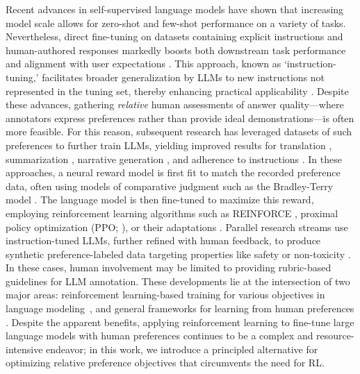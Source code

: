 Recent advances in self-supervised language models have shown that increasing model scale allows for zero-shot \citep{radford2019language} and few-shot performance \citep{gpt3,megatron,chowdhery2022palm} on a variety of tasks. Nevertheless, direct fine-tuning on datasets containing explicit instructions and human-authored responses markedly boosts both downstream task performance and alignment with user expectations \citep{mishra-etal-2022-cross,sanh2022multitask,chung2022scaling,thoppilan2022lamda}. This approach, known as `instruction-tuning,' facilitates broader generalization by LLMs to new instructions not represented in the tuning set, thereby enhancing practical applicability \citep{chung2022scaling}. Despite these advances, gathering \textit{relative} human assessments of answer quality—where annotators express preferences rather than provide ideal demonstrations—is often more feasible. For this reason, subsequent research has leveraged datasets of such preferences to further train LLMs, yielding improved results for translation \citep{kreutzer-etal-2018-reliability}, summarization \citep{stiennon2022learning,ziegler2020finetuning}, narrative generation \citep{ziegler2020finetuning}, and adherence to instructions \citep{ouyang2022training,ramamurthy2023is}. In these approaches, a neural reward model is first fit to match the recorded preference data, often using models of comparative judgment such as the Bradley-Terry model \citep{bradley1952rankanalysis}. The language model is then fine-tuned to maximize this reward, employing reinforcement learning algorithms such as REINFORCE \citep{williams1992reinforce}, proximal policy optimization (PPO; \cite{schulman2017proximal}), or their adaptations \citep{ramamurthy2023is}. Parallel research streams use instruction-tuned LLMs, further refined with human feedback, to produce synthetic preference-labeled data targeting properties like safety or non-toxicity \citep{bai2022constitutional}. In these cases, human involvement may be limited to providing rubric-based guidelines for LLM annotation. These developments lie at the intersection of two major areas: reinforcement learning-based training for various objectives in language modeling~\citep{Ranzato2015SequenceLT,paulus2018a,wu2018learning}, and general frameworks for learning from human preferences \citep{christiano2017deep,kupcsik2018learning}. Despite the apparent benefits, applying reinforcement learning to fine-tune large language models with human preferences continues to be a complex and resource-intensive endeavor; in this work, we introduce a principled alternative for optimizing relative preference objectives that circumvents the need for RL.

